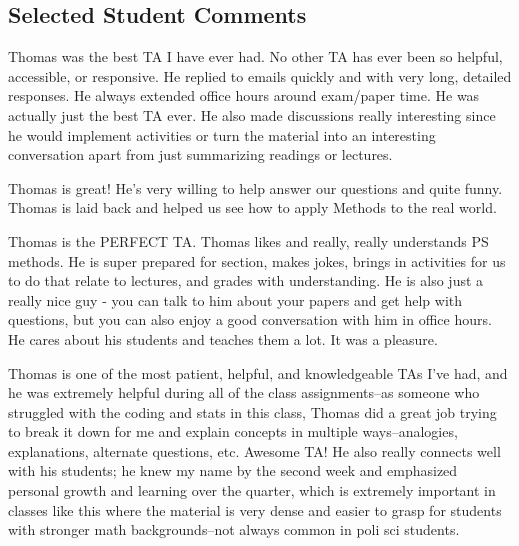 \documentclass[12pt]{article}
\begin{document}
\subsection{Selected Student Comments}
\begin{itemize*}
\item Thomas was the best TA I have ever had. No other TA has ever been so helpful, accessible, or responsive. He replied to emails quickly and with very long, detailed responses. He always extended office hours around exam/paper time. He was actually just the best TA ever. He also made discussions really interesting since he would implement activities or turn the material into an interesting conversation apart from just summarizing readings or lectures.
\item Thomas is great! He's very willing to help answer our questions and quite funny. Thomas is laid back and helped us see how to apply Methods to the real world.
\item Thomas is the PERFECT TA. Thomas likes and really, really understands PS methods. He is super prepared for section, makes jokes, brings in activities for us to do that relate to lectures, and grades with understanding. He is also just a really nice guy - you can talk to him about your papers and get help with questions, but you can also enjoy a good conversation with him in office hours. He cares about his students and teaches them a lot. It was a pleasure.
\item Thomas is one of the most patient, helpful, and knowledgeable TAs I've had, and he was extremely helpful during all of the class assignments--as someone who struggled with the coding and stats in this class, Thomas did a great job trying to break it down for me and explain concepts in multiple ways--analogies, explanations, alternate questions, etc. Awesome TA! He also really connects well with his students; he knew my name by the second week and emphasized personal growth and learning over the quarter, which is extremely important in classes like this where the material is very dense and easier to grasp for students with stronger math backgrounds--not always common in poli sci students. %
\end{itemize*}
\end{document}
